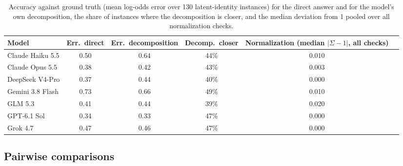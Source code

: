 \documentclass[11pt]{article}
\begin{document}
\begin{table}[h]
\centering\footnotesize
\begin{tabular}{@{}lccccc@{}}
\toprule
Model & Err.\ direct & Err.\ decomposition & Decomp.\ closer & Normalization (median $|\Sigma-1|$, all checks) \\
\midrule
Claude Haiku 5.5 & 0.50 & 0.64 & 44\% & 0.010 \\
Claude Opus 5.5 & 0.38 & 0.42 & 43\% & 0.003 \\
DeepSeek V4-Pro & 0.37 & 0.44 & 40\% & 0.000 \\
Gemini 3.8 Flash & 0.73 & 0.66 & 49\% & 0.010 \\
GLM 5.3 & 0.41 & 0.44 & 39\% & 0.020 \\
GPT-6.1 Sol & 0.34 & 0.33 & 47\% & 0.000 \\
Grok 4.7 & 0.47 & 0.46 & 47\% & 0.000 \\
\bottomrule
\end{tabular}
\caption{Accuracy against ground truth (mean log-odds error over 130 latent-identity instances) for the direct answer and for the model's own decomposition, the share of instances where the decomposition is closer, and the median deviation from 1 pooled over all normalization checks.}
\label{tab:accuracy}
\end{table}

\subsection{Pairwise comparisons}
\label{app:pairwise}
\end{document}
